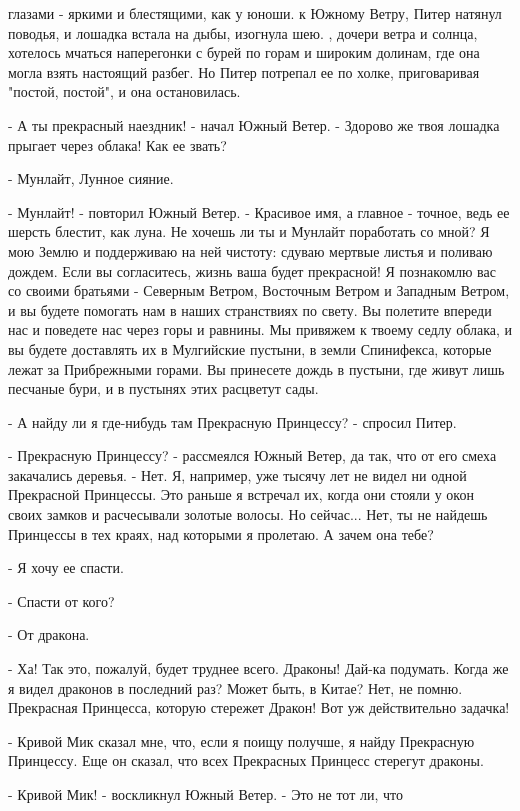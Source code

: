 глазами - яркими и блестящими, как у юноши.
 к Южному Ветру, Питер натянул поводья, и лошадка встала 
на дыбы, изогнула шею.
, дочери ветра и солнца, хотелось мчаться наперегонки с бурей по 
горам и широким долинам, где она могла взять настоящий разбег. Но 
Питер потрепал ее по холке, приговаривая "постой, постой", и она 
остановилась.
\par- А ты прекрасный наездник! - начал Южный Ветер. - Здорово же твоя 
лошадка прыгает через облака! Как ее звать?
\par- Мунлайт, Лунное сияние.
\par- Мунлайт! - повторил Южный Ветер. - Красивое имя, а главное - 
точное, ведь ее шерсть блестит, как луна. Не хочешь ли ты и Мунлайт 
поработать со мной? Я мою Землю и поддерживаю на ней чистоту: сдуваю 
мертвые листья и поливаю дождем. Если вы согласитесь, жизнь ваша будет 
прекрасной! Я познакомлю вас со своими братьями - Северным Ветром, 
Восточным Ветром и Западным Ветром, и вы будете помогать нам в наших 
странствиях по свету. Вы полетите впереди нас и поведете нас через 
горы и равнины. Мы привяжем к твоему седлу облака, и вы будете 
доставлять их в Мулгийские пустыни, в земли Спинифекса, которые лежат 
за Прибрежными горами. Вы принесете дождь в пустыни, где живут лишь 
песчаные бури, и в пустынях этих расцветут сады.
\par- А найду ли я где-нибудь там Прекрасную Принцессу? - спросил 
Питер.
\par- Прекрасную Принцессу? - рассмеялся Южный Ветер, да так, что от 
его смеха закачались деревья. - Нет. Я, например, уже тысячу лет не 
видел ни одной Прекрасной Принцессы. Это раньше я встречал их, когда 
они стояли у окон своих замков и расчесывали золотые волосы. Но 
сейчас... Нет, ты не найдешь Принцессы в тех краях, над которыми я 
пролетаю. А зачем она тебе?
\par- Я хочу ее спасти.
\par- Спасти от кого?
\par- От дракона.
\par- Ха! Так это, пожалуй, будет труднее всего. Драконы! Дай-ка 
подумать. Когда же я видел драконов в последний раз? Может быть, в 
Китае? Нет, не помню. Прекрасная Принцесса, которую стережет Дракон! 
Вот уж действительно задачка!
\par- Кривой Мик сказал мне, что, если я поищу получше, я найду 
Прекрасную Принцессу. Еще он сказал, что всех Прекрасных Принцесс 
стерегут драконы.
\par- Кривой Мик! - воскликнул Южный Ветер. - Это не тот ли, что 
